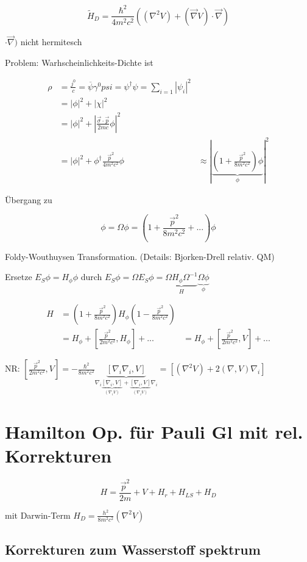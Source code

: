 \[\tilde H_D = \frac{\hbar^2}{4m^2c^2}((\nabla^2V)+(\vec\nabla V)\cdot\vec\nabla)\]

\(\cdot\vec\nabla)\) nicht hermitesch

Problem: Warhscheinlichkeits-Dichte ist

\begin{align}
\rho &= \frac{j^0}{c}=\overline \psi\gamma^0psi = \psi^\dagger\psi = \sum_{i=1}|\psi_i|^2\\
&=|\phi|^2 + |\chi|^2\\
&=|\phi|^2+|\frac{\vec\sigma\cdot\vec p}{2mc}\phi|^2\\
&=|\phi|^2+\phi^\dagger \frac{\vec p^2}{4m^2c^2}\phi
&\approx |\underbrace{(1+\frac{\vec p^2}{8m^2c^2})\phi}_{\phi}|^2
\end{align}

Übergang zu 

\[\phi = \Omega\phi = (1+\frac{\vec p^2}{8m^2c^2}+...)\phi\]

Foldy-Wouthuysen Transformation. (Details: Bjorken-Drell relativ. QM)

Ersetze \(E_S\phi = H_\phi \phi\) durch \(E_S\phi =\Omega E_S\phi = \underbrace{\Omega H_\phi\Omega^{-1}}_{H}\underbrace{\Omega\phi}_{\phi}\)

\begin{align}
H&=(1+\frac{\vec p^2}{8m^2c^2})H_\phi (1-\frac{\vec p^2}{8m^2c^2}) \\
&=H_\phi + [\frac{\vec p^2}{2m^2c^2},H_\phi]+...
&=H_\phi + [\frac{\vec p^2}{2m^2c^2},V]+...
\end{align}

NR: \([\frac{\vec p^2}{2m^2c^2},V]=-\frac{\hbar^2}{8m^2c^2}\underbrace{[\nabla_i\nabla_i,V]}_{\nabla_i\underbrace{[\nabla_i,V]}_{(\nabla_iV)}+\underbrace{[\nabla_i,V]}_{(\nabla_iV)}\nabla_i} = [(\nabla^2 V)+2(\nabla,V)\nabla_i]\)


\section{Hamilton Op. für Pauli Gl mit rel. Korrekturen}

\[H= \frac{\vec p^2}{2m}+V+H_r+H_{LS}+H_D\]

mit Darwin-Term \(H_D=\frac{h^2}{8m^2c^2}(\nabla^2 V)\)


\subsection{Korrekturen zum Wasserstoff spektrum}

